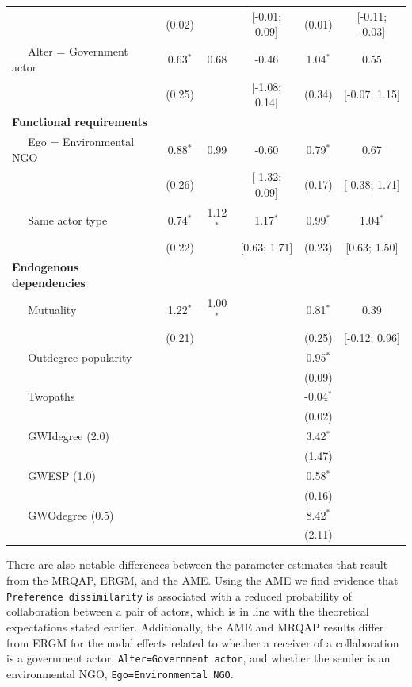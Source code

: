 \documentclass[9pt,twocolumn,twoside,lineno]{pnas-new}
\begin{document}
\begin{table}[ht]
\begin{tabular}{lccccc}
   & (0.02) &  & [-0.01; 0.09] & (0.01) & [-0.11; -0.03] \\
  $\;\;\;\;$ Alter = Government actor & 0.63$^{\ast}$ & 0.68 & -0.46 & 1.04$^{\ast}$ & 0.55 \\
   & (0.25) &  & [-1.08; 0.14] & (0.34) & [-0.07; 1.15] \\
  \textbf{Functional requirements} &  &  &  &  &  \\
  $\;\;\;\;$ Ego = Environmental NGO & 0.88$^{\ast}$ & 0.99 & -0.60 & 0.79$^{\ast}$ & 0.67 \\
   & (0.26) &  & [-1.32; 0.09] & (0.17) & [-0.38; 1.71] \\
  $\;\;\;\;$ Same actor type & 0.74$^{\ast}$ & 1.12$^{\ast}$ & 1.17$^{\ast}$ & 0.99$^{\ast}$ & 1.04$^{\ast}$ \\
   & (0.22) &  & [0.63; 1.71] & (0.23) & [0.63; 1.50] \\
  \textbf{Endogenous dependencies} &  &  &  &  &  \\
  $\;\;\;\;$ Mutuality & 1.22$^{\ast}$ & 1.00$^{\ast}$ &  & 0.81$^{\ast}$ & 0.39 \\
   & (0.21) &  &  & (0.25) & [-0.12; 0.96] \\
  $\;\;\;\;$ Outdegree popularity &  &  &  & 0.95$^{\ast}$ &  \\
   &  &  &  & (0.09) &  \\
  $\;\;\;\;$ Twopaths &  &  &  & -0.04$^{\ast}$ &  \\
   &  &  &  & (0.02) &  \\
  $\;\;\;\;$ GWIdegree (2.0) &  &  &  & 3.42$^{\ast}$ &  \\
   &  &  &  & (1.47) &  \\
  $\;\;\;\;$ GWESP (1.0) &  &  &  & 0.58$^{\ast}$ &  \\
   &  &  &  & (0.16) &  \\
  $\;\;\;\;$ GWOdegree (0.5) &  &  &  & 8.42$^{\ast}$ &  \\
   &  &  &  & (2.11) &  \\
   \hline
\hline
\end{tabular}
\label{tab:regTable}
\end{table}
\FloatBarrier

There are also notable differences between the parameter estimates that result from the MRQAP, ERGM, and the AME. Using the AME we find evidence that \texttt{Preference dissimilarity} is associated with a reduced probability of collaboration between a pair of actors, which is in line with the theoretical expectations stated earlier. Additionally, the AME and MRQAP results differ from ERGM for the nodal effects related to whether a receiver of a collaboration is a government actor, \texttt{Alter=Government actor}, and whether the sender is an environmental NGO, \texttt{Ego=Environmental NGO}.
\end{document}

